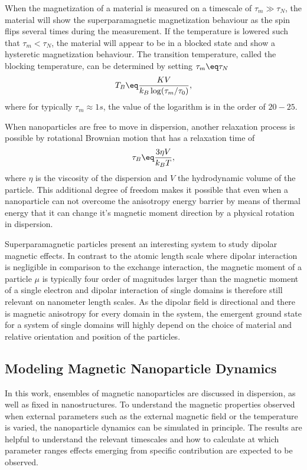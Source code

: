 \documentclass[\main/dresen_thesis.tex]{subfiles}
\begin{document}
      When the magnetization of a material is measured on a timescale of $\tau_m \gg \tau_N$, the material will show the superparamagnetic magnetization behaviour as the spin flips several times during the measurement.
      If the temperature is lowered such that $\tau_m < \tau_N$, the material will appear to be in a blocked state and show a hysteretic magnetization behaviour.
      The transition temperature, called the blocking temperature, can be determined by setting $\tau_m \eq \tau_N$
      \begin{align}
        \label{eq:theoreticalBackground:superparamagnetism:blockingTemp}
        T_B \eq \frac{KV}{k_B \log(\tau_m/\tau_0)},
      \end{align}
      where for typically $\tau_m \approx 1 \unit{s}$, the value of the logarithm is in the order of $20 - 25$.

      When nanoparticles are free to move in dispersion, another relaxation process is possible by rotational Brownian motion that has a relaxation time of \cite{Einstein_1956_Inves}
      \begin{align}
        \tau_B \eq \frac{3 \eta V}{k_B T},
      \end{align}
      where $\eta$ is the viscosity of the dispersion and $V$ the hydrodynamic volume of the particle.
      This additional degree of freedom makes it possible that even when a nanoparticle can not overcome the anisotropy energy barrier by means of thermal energy that it can change it's magnetic moment direction by a physical rotation in dispersion.

      Superparamagnetic particles present an interesting system to study dipolar magnetic effects.
      In contrast to the atomic length scale where dipolar interaction is negligible in comparison to the exchange interaction, the magnetic moment of a particle $\mu$ is typically four order of magnitudes larger than the magnetic moment of a single electron and dipolar interaction of single domains is therefore still relevant on nanometer length scales.
      As the dipolar field is directional and there is magnetic anisotropy for every domain in the system, the emergent ground state for a system of single domains will highly depend on the choice of material and relative orientation and position of the particles.

    \subsection{Modeling Magnetic Nanoparticle Dynamics}
      In this work, ensembles of magnetic nanoparticles are discussed in dispersion, as well as fixed in nanostructures.
      To understand the magnetic properties observed when external parameters such as the external magnetic field or the temperature is varied, the nanoparticle dynamics can be simulated in principle.
      The results are helpful to understand the relevant timescales and how to calculate at which parameter ranges effects emerging from specific contribution are expected to be observed.
\end{document}
